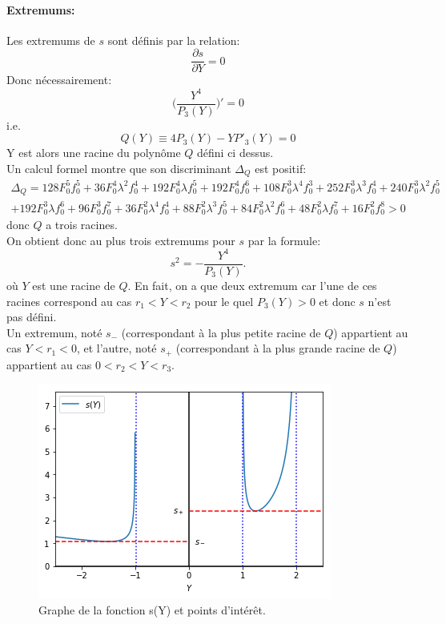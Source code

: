 \documentclass[11pt]{article}
\begin{document}
\paragraph{Extremums:} Les extremums de $s$ sont définis par la relation:\begin{equation}
	\frac{\partial s}{\partial Y}=0
\end{equation}
Donc nécessairement: \begin{equation}
	\Big(\frac{Y^4}{P_3(Y)}\Big)'=0
\end{equation} 
i.e. \begin{equation}
\label{eq:Q}	Q(Y)\equiv4P_3(Y)-YP'_3(Y)=0
\end{equation}
Y est alors une racine du polynôme $Q$ défini ci dessus.\\
 Un calcul formel montre que son discriminant $\Delta _Q$ est positif: \begin{multline*}
\Delta _Q = 128F_0^5f_0^5 + 36 F_0^4 \lambda^2 f_0^4 + 192 F_0^4 \lambda f_0^5 + 192 F_0^4 f_0^6 + 108 F_0^3 \lambda^4 f_0^3 + 252 F_0^3 \lambda^3 f_0^4 + 240 F_0^3 \lambda^2 f_0^5 \\+ 192 F_0^3 \lambda f_0^6 + 96 F_0^3 f_0^7 + 36 F_0^2 \lambda^4 f_0^4 + 88 F_0^2 \lambda^3 f_0^5 + 84 F_0^2 \lambda^2 f_0^6 + 48 F_0^2 \lambda f_0^7 + 16 F_0^2 f_0^8 > 0
\end{multline*} donc $Q$ a trois racines.\\
On obtient donc au plus trois extremums pour $s$ par la formule: \begin{equation*}
	s^2 = -\frac{Y^4}{P_3(Y)}.
\end{equation*}
où $Y$ est une racine de $Q$. En fait, on a que deux extremum car l'une de ces racines correspond  au cas $r_1<Y<r_2$ pour le quel $P_3(Y)>0$ et donc $s$ n'est pas défini.\\ Un extremum, noté $s_-$ (correspondant à la plus petite racine de $Q$) appartient au cas $Y<r_1<0$, et l'autre, noté $s_+$ (correspondant à la plus grande racine de $Q$) appartient au cas $0<r_2<Y<r_3$. 
\newpage
\begin{figure}[h!]
\centering
\includegraphics[width=.7\textwidth]{Images/s+s-.png}
\caption{Graphe de la fonction s(Y) et points d’intérêt.}
\end{figure}
\end{document}
